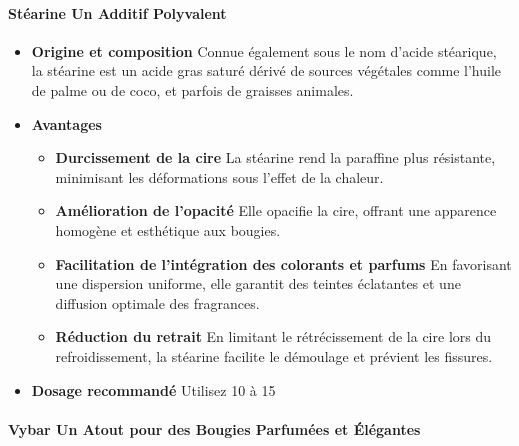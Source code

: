 \documentclass[11pt,fleqn,onecolumn,oneside]{book}
\begin{document}
\paragraph{Stéarine Un Additif Polyvalent}

\begin{itemize}
    \item \textbf{Origine et composition} Connue également sous le nom d’acide stéarique, la stéarine est un acide gras saturé dérivé de sources végétales comme l’huile de palme ou de coco, et parfois de graisses animales.
    \item \textbf{Avantages}
        \begin{itemize}
            \item \textbf{Durcissement de la cire} La stéarine rend la paraffine plus résistante, minimisant les déformations sous l’effet de la chaleur.
            \item \textbf{Amélioration de l’opacité} Elle opacifie la cire, offrant une apparence homogène et esthétique aux bougies.
            \item \textbf{Facilitation de l’intégration des colorants et parfums} En favorisant une dispersion uniforme, elle garantit des teintes éclatantes et une diffusion optimale des fragrances.
            \item \textbf{Réduction du retrait} En limitant le rétrécissement de la cire lors du refroidissement, la stéarine facilite le démoulage et prévient les fissures.
        \end{itemize}
    \item \textbf{Dosage recommandé} Utilisez 10 à 15 %
\end{itemize}

\paragraph{Vybar Un Atout pour des Bougies Parfumées et Élégantes}
\end{document}
